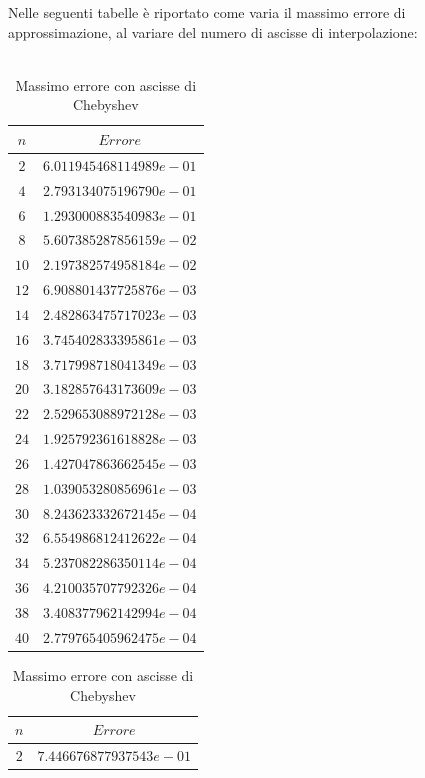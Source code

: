 Nelle seguenti tabelle è riportato come varia il massimo errore di approssimazione, al variare del numero di ascisse di interpolazione:\\\
\begin{table}[H]
	\begin{minipage}{0.5\textwidth}
		\centering
		\caption{Massimo errore con ascisse equispaziate}
		\begin{tabular}{|c|c|}
			\hline
			$n$ & $Errore$ \\
			\hline
			$2$  & $6.011945468114989e-01$ \\ 
			$4$  & $2.793134075196790e-01$ \\ 
			$6$  & $1.293000883540983e-01$ \\ 
			$8$  & $5.607385287856159e-02$ \\ 
			$10$ & $2.197382574958184e-02$ \\ 
			$12$ & $6.908801437725876e-03$ \\ 
			$14$ & $2.482863475717023e-03$ \\ 
			$16$ & $3.745402833395861e-03$ \\ 
			$18$ & $3.717998718041349e-03$ \\ 
			$20$ & $3.182857643173609e-03$ \\ 
			$22$ & $2.529653088972128e-03$ \\ 
			$24$ & $1.925792361618828e-03$ \\ 
			$26$ & $1.427047863662545e-03$ \\ 
			$28$ & $1.039053280856961e-03$ \\ 
			$30$ & $8.243623332672145e-04$ \\ 
			$32$ & $6.554986812412622e-04$ \\ 
			$34$ & $5.237082286350114e-04$ \\ 
			$36$ & $4.210035707792326e-04$ \\ 
			$38$ & $3.408377962142994e-04$ \\ 
			$40$ & $2.779765405962475e-04$ \\ 
			\hline
		\end{tabular}
	\end{minipage}
	\hspace*{\fill}
	\begin{minipage}{0.5\textwidth}
		\centering
		\caption{Massimo errore con ascisse di Chebyshev}
		\begin{tabular}{|c|c|}
			\hline
			$n$ & $Errore$ \\
			\hline
			$2$  & $7.446676877937543e-01$ \\ 

\end{tabular}
\end{minipage}
\end{table}
